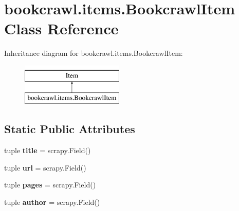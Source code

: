\hypertarget{classbookcrawl_1_1items_1_1BookcrawlItem}{}\section{bookcrawl.\+items.\+Bookcrawl\+Item Class Reference}
\label{classbookcrawl_1_1items_1_1BookcrawlItem}
Inheritance diagram for bookcrawl.\+items.\+Bookcrawl\+Item\+:\begin{figure}[H]
\begin{center}
\leavevmode
\includegraphics[height=2.000000cm]{classbookcrawl_1_1items_1_1BookcrawlItem}
\end{center}
\end{figure}
\subsection*{Static Public Attributes}
\begin{DoxyCompactItemize}
\item 
\hypertarget{classbookcrawl_1_1items_1_1BookcrawlItem_a037515234b6049bd0775a0a7356ffed2}{}tuple {\bfseries title} = scrapy.\+Field()\label{classbookcrawl_1_1items_1_1BookcrawlItem_a037515234b6049bd0775a0a7356ffed2}

\item 
\hypertarget{classbookcrawl_1_1items_1_1BookcrawlItem_ad2aafe952f2b7f9456890bd732439e41}{}tuple {\bfseries url} = scrapy.\+Field()\label{classbookcrawl_1_1items_1_1BookcrawlItem_ad2aafe952f2b7f9456890bd732439e41}

\item 
\hypertarget{classbookcrawl_1_1items_1_1BookcrawlItem_a68976a4d2435a542a155171412100961}{}tuple {\bfseries pages} = scrapy.\+Field()\label{classbookcrawl_1_1items_1_1BookcrawlItem_a68976a4d2435a542a155171412100961}

\item 
\hypertarget{classbookcrawl_1_1items_1_1BookcrawlItem_a903ec34de2f892101a57bcc499070add}{}tuple {\bfseries author} = scrapy.\+Field()\label{classbookcrawl_1_1items_1_1BookcrawlItem_a903ec34de2f892101a57bcc499070add}

\end{DoxyCompactItemize}


